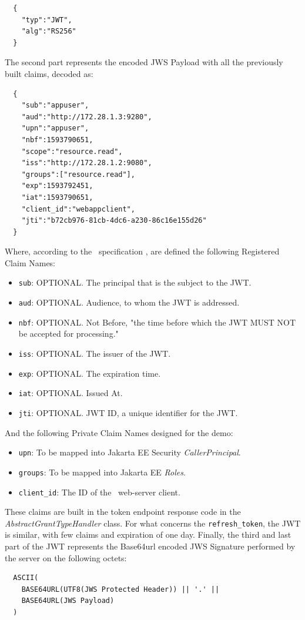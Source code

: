 \begin{lstlisting}
  {
    "typ":"JWT",
    "alg":"RS256"
  }
\end{lstlisting}

\noindent The second part represents the encoded JWS Payload with all the previously built claims, decoded as:

\begin{lstlisting}
  {
    "sub":"appuser",
    "aud":"http://172.28.1.3:9280",
    "upn":"appuser",
    "nbf":1593790651,
    "scope":"resource.read",
    "iss":"http://172.28.1.2:9080",
    "groups":["resource.read"],
    "exp":1593792451,
    "iat":1593790651,
    "client_id":"webappclient",
    "jti":"b72cb976-81cb-4dc6-a230-86c16e155d26"
  }
\end{lstlisting}

\noindent Where, according to the \ specification \cite{RFC7519}, are defined the following Registered Claim Names:

\begin{itemize}
    \item \texttt{sub}: OPTIONAL. The principal that is the subject to the JWT.
    \item \texttt{aud}: OPTIONAL. Audience, to whom the JWT is addressed.
    \item \texttt{nbf}: OPTIONAL. Not Before, "the time before which the JWT MUST NOT be accepted for processing." \cite{RFC7519}
    \item \texttt{iss}: OPTIONAL. The issuer of the JWT.
    \item \texttt{exp}: OPTIONAL. The expiration time.
    \item \texttt{iat}: OPTIONAL. Issued At.
    \item \texttt{jti}: OPTIONAL. JWT ID, a unique identifier for the JWT.
\end{itemize}

\noindent And the following Private Claim Names designed for the demo:

\begin{itemize}
    \item \texttt{upn}: To be mapped into Jakarta EE Security \textit{CallerPrincipal}.
    \item \texttt{groups}: To be mapped into Jakarta EE \textit{Roles}.
    \item \texttt{client\_id}: The ID of the \oauth\ web-server client.
\end{itemize}

\noindent These claims are built in the token endpoint response code in the \textit{AbstractGrantTypeHandler} class. For what concerns the \texttt{refresh\_token}, the JWT is similar, with few claims and expiration of one day.
Finally, the third and last part of the JWT represents the Base64url encoded JWS Signature performed by the server on the following octets:
\begin{lstlisting}
  ASCII(
    BASE64URL(UTF8(JWS Protected Header)) || '.' ||
    BASE64URL(JWS Payload)
  )
\end{lstlisting}

